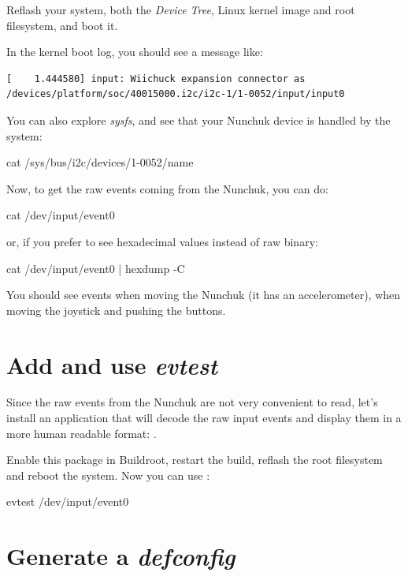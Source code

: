 Reflash your system, both the {\em Device Tree}, Linux kernel image
and root filesystem, and boot it.

In the kernel boot log, you should see a message like:

\begin{verbatim}
[    1.444580] input: Wiichuck expansion connector as /devices/platform/soc/40015000.i2c/i2c-1/1-0052/input/input0
\end{verbatim}

You can also explore {\em sysfs}, and see that your Nunchuk device is
handled by the system:

\begin{bashinput}
cat /sys/bus/i2c/devices/1-0052/name
\end{bashinput}

Now, to get the raw events coming from the Nunchuk, you can do:

\begin{bashinput}
cat /dev/input/event0
\end{bashinput}

or, if you prefer to see hexadecimal values instead of raw binary:

\begin{bashinput}
cat /dev/input/event0 | hexdump -C
\end{bashinput}

You should see events when moving the Nunchuk (it has an
accelerometer), when moving the joystick and pushing the buttons.

\section{Add and use {\em evtest}}

Since the raw events from the Nunchuk are not very convenient to read,
let's install an application that will decode the raw input events
and display them in a more human readable format: .

Enable this package in Buildroot, restart the build, reflash the root
filesystem and reboot the system. Now you can use :

\begin{bashinput}
evtest /dev/input/event0
\end{bashinput}

\section{Generate a {\em defconfig}}

